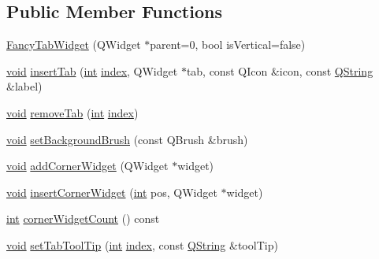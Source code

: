 \subsection*{Public Member Functions}
\begin{DoxyCompactItemize}
\item 
\hyperlink{group___core_plugin_ga613267396e22b38e5decd277c32ec677}{Fancy\-Tab\-Widget} (Q\-Widget $\ast$parent=0, bool is\-Vertical=false)
\item 
\hyperlink{group___u_a_v_objects_plugin_ga444cf2ff3f0ecbe028adce838d373f5c}{void} \hyperlink{group___core_plugin_ga835076793ff92fcdbd7d496856ffd7a3}{insert\-Tab} (\hyperlink{ioapi_8h_a787fa3cf048117ba7123753c1e74fcd6}{int} \hyperlink{glext_8h_ab47dd9958bcadea08866b42bf358e95e}{index}, Q\-Widget $\ast$tab, const Q\-Icon \&icon, const \hyperlink{group___u_a_v_objects_plugin_gab9d252f49c333c94a72f97ce3105a32d}{Q\-String} \&label)
\item 
\hyperlink{group___u_a_v_objects_plugin_ga444cf2ff3f0ecbe028adce838d373f5c}{void} \hyperlink{group___core_plugin_ga97b9e10d9f0aa2be2fff83cba46e1d29}{remove\-Tab} (\hyperlink{ioapi_8h_a787fa3cf048117ba7123753c1e74fcd6}{int} \hyperlink{glext_8h_ab47dd9958bcadea08866b42bf358e95e}{index})
\item 
\hyperlink{group___u_a_v_objects_plugin_ga444cf2ff3f0ecbe028adce838d373f5c}{void} \hyperlink{group___core_plugin_gabedd59a53dfd1c5abff89f6deb134cab}{set\-Background\-Brush} (const Q\-Brush \&brush)
\item 
\hyperlink{group___u_a_v_objects_plugin_ga444cf2ff3f0ecbe028adce838d373f5c}{void} \hyperlink{group___core_plugin_ga78144a9e9cee024583d1a5fec9332e67}{add\-Corner\-Widget} (Q\-Widget $\ast$widget)
\item 
\hyperlink{group___u_a_v_objects_plugin_ga444cf2ff3f0ecbe028adce838d373f5c}{void} \hyperlink{group___core_plugin_gabfaa2256cd7b55c58fa3f58b086ea922}{insert\-Corner\-Widget} (\hyperlink{ioapi_8h_a787fa3cf048117ba7123753c1e74fcd6}{int} pos, Q\-Widget $\ast$widget)
\item 
\hyperlink{ioapi_8h_a787fa3cf048117ba7123753c1e74fcd6}{int} \hyperlink{group___core_plugin_ga5ac9f922ffa0e17cff4f319d2435e2cb}{corner\-Widget\-Count} () const 
\item 
\hyperlink{group___u_a_v_objects_plugin_ga444cf2ff3f0ecbe028adce838d373f5c}{void} \hyperlink{group___core_plugin_gab6310d99d182cd768b9d1ad93de69917}{set\-Tab\-Tool\-Tip} (\hyperlink{ioapi_8h_a787fa3cf048117ba7123753c1e74fcd6}{int} \hyperlink{glext_8h_ab47dd9958bcadea08866b42bf358e95e}{index}, const \hyperlink{group___u_a_v_objects_plugin_gab9d252f49c333c94a72f97ce3105a32d}{Q\-String} \&tool\-Tip)

\end{DoxyCompactItemize}
